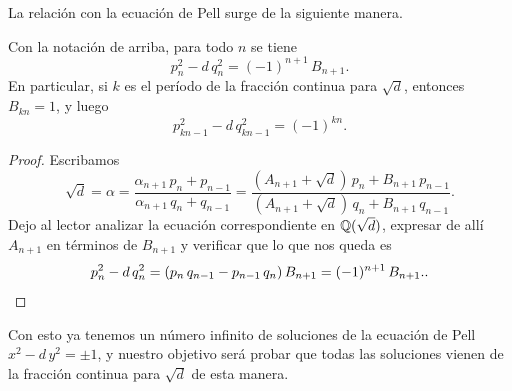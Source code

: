 La relación con la ecuación de Pell surge de la siguiente manera.

\begin{proposicion}
  Con la notación de arriba, para todo $n$ se tiene
  $$p_n^2 - d\,q_n^2 = (-1)^{n+1}\,B_{n+1}.$$
  En particular, si $k$ es el período de la fracción continua para $\sqrt{d}$,
  entonces $B_{kn} = 1$, y luego
  $$p_{kn - 1}^2 - d\,q_{kn-1}^2 = (-1)^{kn}.$$

  \begin{proof}
    Escribamos
    \[ \sqrt{d} = \alpha =
       \frac{\alpha_{n+1}\,p_n + p_{n-1}}{\alpha_{n+1}\,q_n + q_{n-1}} =
       \frac{(A_{n+1} + \sqrt{d})\,p_n + B_{n+1}\,p_{n-1}}{(A_{n+1} + \sqrt{d})\,q_n + B_{n+1}\,q_{n-1}}. \]
    Dejo al lector analizar la ecuación correspondiente en $\mathbb{Q} (\sqrt{d})$,
    expresar de allí $A_{n+1}$ en términos de $B_{n+1}$ y verificar que lo que
    nos queda es
    \[ p_n^2 - d\,q_n^2 =
       (p_n\,q_{n-1} - p_{n-1}\,q_n)\,B_{n+1} = (-1)^{n+1}\,B_{n+1}. \qedhere. \]
  \end{proof}
\end{proposicion}

Con esto ya tenemos un número infinito de soluciones de la ecuación de Pell
$x^2 - d\,y^2 = \pm 1$, y nuestro objetivo será probar que todas las soluciones
vienen de la fracción continua para $\sqrt{d}$ de esta manera.

